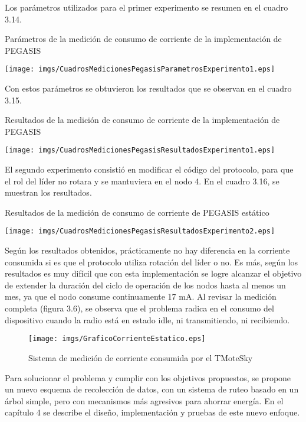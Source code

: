 Los parámetros utilizados para el primer experimento se resumen en el cuadro 3.14.

\begin{table}[H]
  \centering
  \caption{Parámetros de la medición de consumo de corriente de la implementación de PEGASIS}
 \texttt{[image: imgs/CuadrosMedicionesPegasisParametrosExperimento1.eps]}
 \end{table}
 
 Con estos parámetros se obtuvieron los resultados que se observan en el cuadro 3.15.

\begin{table}[H]
  \centering
  \caption{Resultados de la medición de consumo de corriente de la implementación de PEGASIS}
 \texttt{[image: imgs/CuadrosMedicionesPegasisResultadosExperimento1.eps]}
 \end{table}

El segundo experimento consistió en modificar el código del protocolo, para que el rol del líder no rotara y se mantuviera en el nodo 4. En el cuadro 3.16, se muestran los resultados.

\begin{table}[H]
  \centering
  \caption{Resultados de la medición de consumo de corriente de PEGASIS estático}
 \texttt{[image: imgs/CuadrosMedicionesPegasisResultadosExperimento2.eps]}
 \end{table}


Según los resultados obtenidos, prácticamente no hay diferencia en la corriente consumida si es que el protocolo utiliza rotación del líder o no. Es más, según los resultados es muy difícil que con esta implementación se logre alcanzar el objetivo de extender la duración del ciclo de operación de los nodos hasta al menos un mes, ya que el nodo consume continuamente 17 mA. Al revisar la medición completa (figura 3.6), se observa que el problema radica en el consumo del dispositivo cuando la radio está en estado idle, ni transmitiendo, ni recibiendo.\\

\begin{figure}[H]
  \centering
 \texttt{[image: imgs/GraficoCorrienteEstatico.eps]}
 \caption{Sistema de medición de corriente consumida por el TMoteSky}
\end{figure}

Para solucionar el problema y cumplir con los objetivos propuestos, se propone un nuevo esquema de recolección de datos, con un sistema de ruteo basado en un árbol simple, pero con mecanismos más agresivos para ahorrar energía. En el capítulo 4 se describe el diseño, implementación y pruebas de este nuevo enfoque. 

